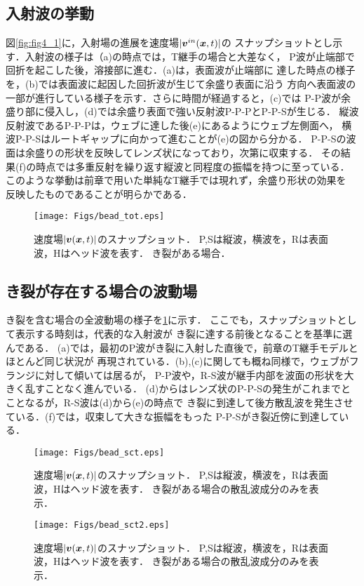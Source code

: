 \subsection{入射波の挙動}
図\ref{fig:fig4_1}に，入射場の進展を速度場$|\mbox{\boldmath $v$}^{in}(\mbox{\boldmath $x$},t)|$の
スナップショットとし示す．入射波の様子は（a)の時点では，T継手の場合と大差なく，
P波が止端部で回折を起こした後，溶接部に進む．(a)は，表面波が止端部に
達した時点の様子を，(b)では表面波に起因した回折波が生じて余盛り表面に沿う
方向へ表面波の一部が進行している様子を示す．さらに時間が経過すると，(c)では
P-P波が余盛り部に侵入し，(d)では余盛り表面で強い反射波P-P-PとP-P-Sが生じる．
縦波反射波であるP-P-Pは，ウェブに達した後(e)にあるようにウェブ左側面へ，
横波P-P-Sはルートギャップに向かって進むことが(e)の図から分かる．
P-P-Sの波面は余盛りの形状を反映してレンズ状になっており，次第に収束する．
その結果(f)の時点では多重反射を繰り返す縦波と同程度の振幅を持つに至っている．
このような挙動は前章で用いた単純なT継手では現れず，余盛り形状の効果を
反映したものであることが明らかである．
\begin{figure}[h]
	\begin{center}
	\texttt{[image: Figs/bead\_tot.eps]} 
	\end{center}
	\caption{
		速度場$|\mbox{\boldmath $v$}(\mbox{\boldmath $x$},t)|$のスナップショット．
		P,Sは縦波，横波を，Rは表面波，Hはヘッド波を表す．
		き裂がある場合．
	} 
	\label{fig:fig4_2}
\end{figure}
\subsection{き裂が存在する場合の波動場}
き裂を含む場合の全波動場の様子を\ref{fig:fig4_2}に示す．
ここでも，スナップショットとして表示する時刻は，代表的な入射波が
き裂に達する前後となることを基準に選んである．
(a)では，最初のP波がき裂に入射した直後で，前章のT継手モデルとほとんど同じ状況が
再現されている．(b),(c)に関しても概ね同様で，ウェブがフランジに対して傾いては居るが，
P-P波や，R-S波が継手内部を波面の形状を大きく乱すことなく進んでいる．
(d)からはレンズ状のP-P-Sの発生がこれまでとことなるが，R-S波は(d)から(e)の時点で
き裂に到達して後方散乱波を発生させている．(f)では，収束して大きな振幅をもった
P-P-Sがき裂近傍に到達している．
\begin{figure}[h]
	\begin{center}
	\texttt{[image: Figs/bead\_sct.eps]} 
	\end{center}
	\caption{
		速度場$|\mbox{\boldmath $v$}(\mbox{\boldmath $x$},t)|$のスナップショット．
		P,Sは縦波，横波を，Rは表面波，Hはヘッド波を表す．
		き裂がある場合の散乱波成分のみを表示．
	} 
	\label{fig:fig4_3}
\end{figure}
\begin{figure}[h]
	\begin{center}
	\texttt{[image: Figs/bead\_sct2.eps]} 
	\end{center}
	\caption{
		速度場$|\mbox{\boldmath $v$}(\mbox{\boldmath $x$},t)|$のスナップショット．
		P,Sは縦波，横波を，Rは表面波，Hはヘッド波を表す．
		き裂がある場合の散乱波成分のみを表示．
	} 
	\label{fig:fig4_4}
\end{figure}
